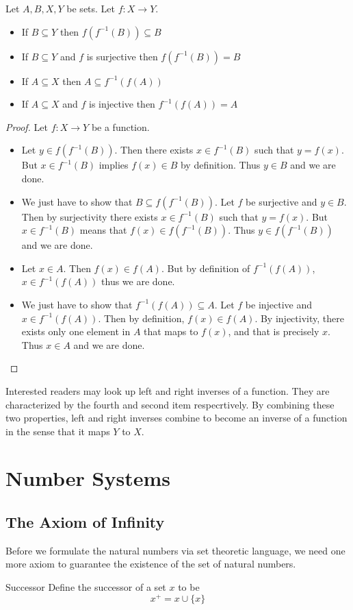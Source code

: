 \documentclass[a4paper]{article}
\begin{document}
\begin{prp}{}{} Let $A,B,X,Y$ be sets. Let $f:X\to Y$. 
\begin{itemize}
\item If $B\subseteq Y$ then $f(f^{-1}(B))\subseteq B$
\item If $B\subseteq Y$ and $f$ is surjective then $f(f^{-1}(B))=B$
\item If $A\subseteq X$ then $A\subseteq f^{-1}(f(A))$
\item If $A\subseteq X$ and $f$ is injective then $f^{-1}(f(A))=A$
\end{itemize} 
\begin{proof}
Let $f:X\to Y$ be a function. 
\begin{itemize}
\item Let $y\in f(f^{-1}(B))$. Then there exists $x\in f^{-1}(B)$ such that $y=f(x)$. But $x\in f^{-1}(B)$ implies $f(x)\in B$ by definition. Thus $y\in B$ and we are done. 
\item We just have to show that $B\subseteq f(f^{-1}(B))$. Let $f$ be surjective and $y\in B$. Then by surjectivity there exists $x\in f^{-1}(B)$ such that $y=f(x)$. But $x\in f^{-1}(B)$ means that $f(x)\in f(f^{-1}(B))$. Thus $y\in f(f^{-1}(B))$ and we are done. 
\item Let $x\in A$. Then $f(x)\in f(A)$. But by definition of $f^{-1}(f(A))$, $x\in f^{-1}(f(A))$ thus we are done. 
\item We just have to show that $f^{-1}(f(A))\subseteq A$. Let $f$ be injective and $x\in f^{-1}(f(A))$. Then by definition, $f(x)\in f(A)$. By injectivity, there exists only one element in $A$ that maps to $f(x)$, and that is precisely $x$. Thus $x\in A$ and we are done. 
\end{itemize}
\end{proof}
\end{prp}

Interested readers may look up left and right inverses of a function. They are characterized by the fourth and second item respecrtively. By combining these two properties, left and right inverses combine to become an inverse of a function in the sense that it maps $Y$ to $X$. \\

\pagebreak

\section{Number Systems}
\subsection{The Axiom of Infinity}
Before we formulate the natural numbers via set theoretic language, we need one more axiom to guarantee the existence of the set of natural numbers. 
\begin{defn}{Successor}{} Define the successor of a set $x$ to be $$x^+=x\cup\{x\}$$
\end{defn}
\end{document}
